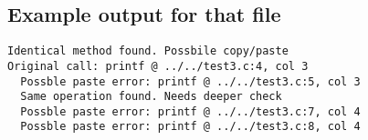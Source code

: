 \documentclass[a4paper,11pt]{article}
\theoremstyle{mytheor}
\begin{document}
\subsection*{Example output for that file}
\begin{verbatim}
Identical method found. Possbile copy/paste
Original call: printf @ ../../test3.c:4, col 3
  Possble paste error: printf @ ../../test3.c:5, col 3
  Same operation found. Needs deeper check
  Possble paste error: printf @ ../../test3.c:7, col 4
  Possble paste error: printf @ ../../test3.c:8, col 4
\end{verbatim}
\end{document}
